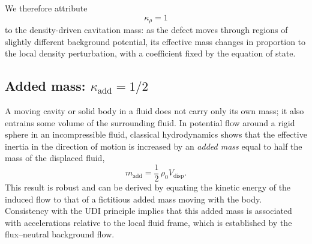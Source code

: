 \documentclass[11pt]{article}
\begin{document}
We therefore attribute
\begin{equation}
  \kappa_\rho = 1
\end{equation}
to the density-driven cavitation mass: as the defect moves through regions of slightly different background potential, its effective mass changes in proportion to the local density perturbation, with a coefficient fixed by the equation of state.

\subsection{Added mass: \texorpdfstring{$\kappa_{\mathrm{add}} = 1/2$}{kappa\_add = 1/2}}
\label{sec:hydro_kappa_add}

A moving cavity or solid body in a fluid does not carry only its own mass; it also entrains some volume of the surrounding fluid. In potential flow around a rigid sphere in an incompressible fluid, classical hydrodynamics shows that the effective inertia in the direction of motion is increased by an \emph{added mass} equal to half the mass of the displaced fluid,
\begin{equation}
  m_{\mathrm{add}} = \frac{1}{2}\,\rho_0 V_{\mathrm{disp}}.
\end{equation}
This result is robust and can be derived by equating the kinetic energy of the induced flow to that of a fictitious added mass moving with the body. Consistency with the UDI principle implies that this added mass is associated with accelerations relative to the local fluid frame, which is established by the flux--neutral background flow.
\end{document}
